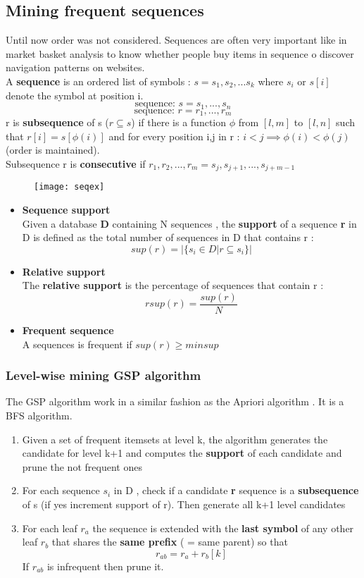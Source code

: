 \subsection{Mining frequent sequences}
Until now order was not considered. Sequences are often very important like in market basket analysis to know whether people buy items in sequence o discover navigation patterns on websites.\\
A \textbf{sequence} is an ordered list of symbols : $s = s_1,s_2,...s_k$ where $s_i$  or $s[i]$ denote the symbol at position i.
$$ \text{sequence: } s= s_1,...,s_n$$
$$ \text{sequence: } r=r_1,...,r_m$$
r is \textbf{subsequence} of s  ($r \subseteq s $) if there is a function $\phi$ from $[l,m]$ to $[l,n]$ such that $r[i] =s[\phi(i)]$ and for every position i,j in r : $i<j \implies \phi(i) < \phi(j)$ (order is maintained).\\
Subsequence r is \textbf{consecutive} if $r_1,r_2,...,r_m=s_j,s_{j+1},...,s_{j+m-1}$ \begin{figure}[H]
  \centering
  \texttt{[image: seqex]}
\end{figure}
\begin{itemize}
\item \textbf{Sequence support}\\
Given a database \textbf{D} containing N sequences , the \textbf{support} of a sequence \textbf{r} in D is defined as the total number of sequences in D that contains r : 
$$ sup(r) = |\{ s_i \in D | r \subseteq s_i \}|$$
\item \textbf{Relative support}\\
The \textbf{relative support} is the percentage of sequences that contain r : 
$$ rsup(r) = \frac{sup(r)}{N}$$
\item \textbf{Frequent sequence}\\
A sequences is frequent if $sup(r) \geq minsup$
\end{itemize}

\subsubsection{Level-wise mining  GSP algorithm}
The GSP algorithm work in a similar fashion as the Apriori algorithm . It is a BFS algorithm.
\begin{enumerate}
\item Given a set of frequent itemsets at level k, the algorithm generates the candidate for level k+1 and computes the \textbf{support} of each candidate and prune the not frequent ones
\item For each sequence $s_i$ in D , check if a candidate \textbf{r} sequence is a \textbf{subsequence} of s (if yes  increment support of r). Then generate all k+1 level candidates
\item For each leaf $r_a$ the sequence is extended with the \textbf{last symbol} of any other leaf $r_b$ that shares the \textbf{same prefix} ( = same parent) so that $$ r_{ab} = r_a+r_b[k]$$ If $r_{ab}$ is infrequent then prune it.
\end{enumerate}

